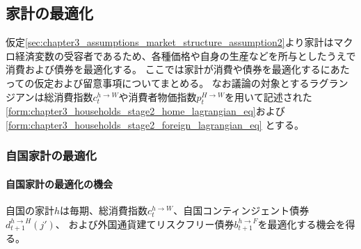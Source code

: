 
\subsection{家計の最適化}
\label{sec:household_optimization}
仮定\eqref{sec:chapter3_assumptions_market_structure_assumption2}より家計はマクロ経済変数の受容者であるため、各種価格や自身の生産などを所与としたうえで消費および債券を最適化する。
ここでは家計が消費や債券を最適化するにあたっての仮定および留意事項についてまとめる。
なお議論の対象とするラグランジアンは総消費指数\(c_t^{h\to W}\)や消費者物価指数\(p_t^{H\to W}\)を用いて記述された
\eqref{form:chapter3_households_stage2_home_lagrangian_eq}および
\eqref{form:chapter3_households_stage2_foreign_lagrangian_eq}
とする。

\subsubsection{自国家計の最適化}
\label{sec:household_optimization_home}

\paragraph{自国家計の最適化の機会}
\label{sec:household_optimization_home_opportunity}
自国の家計\(h\)は毎期、総消費指数\(c_t^{h\to W}\)、自国コンティンジェント債券\(d_{t+1}^{h\to H}(j')\)、
および外国通貨建てリスクフリー債券\(b_{t+1}^{h\to F}\)を最適化する機会を得る。

